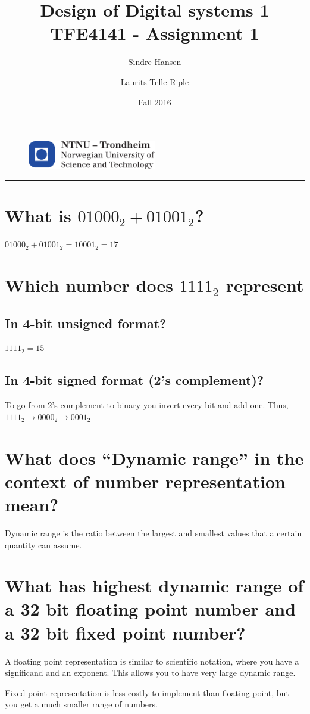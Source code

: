 \documentclass{article}
\title{Design of Digital systems 1 TFE4141 - Assignment 1}
\author{Sindre Hansen \and Laurits Telle Riple}
\date{Fall 2016}
\begin{document}
\begin{figure}
  \centering
  \includegraphics[width=0.5\textwidth]{images/logontnu_eng}
\end{figure}
\maketitle
\rule{\linewidth}{0.5mm}

\section{What is $01000_2 + 01001_2$?}
$01000_2 + 01001_2 = 10001_2 = 17 $

\section{Which number does $1111_2$ represent}
\subsection{In 4-bit unsigned format?}
$1111_2 = 15$
\subsection{In 4-bit signed format (2's complement)?}
To go from 2's complement to binary you invert every bit and add
one. Thus, $1111_2 \rightarrow 0000_2 \rightarrow 0001_2$

\section{What does ``Dynamic range'' in the context of number
  representation mean?}
Dynamic range is the ratio between the largest and smallest values
that a certain quantity can assume.

\section{What has highest dynamic range of a 32 bit floating point
  number and a 32 bit fixed point number?}
A floating point representation is similar to scientific notation,
where you have a significand and an exponent. This allows you to have
very large dynamic range.

Fixed point representation is less costly to implement than floating
point, but you get a much smaller range of numbers.
\end{document}
